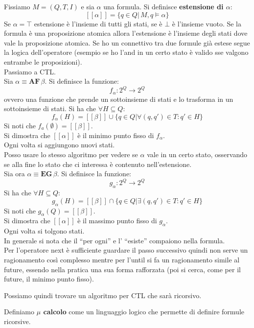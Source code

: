 \begin{definizione}
  Fissiamo $M=(Q, T, I)$ e sia $\alpha$ una formula. Si definisce
  \textbf{estensione di $\alpha$}:
  \[[[\alpha]]=\{q\in Q|\, M, q\vDash \alpha\}\]
  Se $\alpha=\top$ estensione è l'insieme di tutti gli stati, se è $\bot$ è
  l'insieme vuoto. Se la formula è una proposizione atomica allora l'estensione
  è l'insieme degli stati dove vale la proposizione atomica. Se ho un connettivo
  tra due formule già estese segue la logica dell'operatore (esempio se ho l'and
  in un certo stato è valido sse valgono entrambe le proposizioni).\\
  Passiamo a CTL.\\
  Sia $\alpha\equiv\mathbf{AF}\,\beta$. Si
  definisce la funzione:
  \[f_\alpha:2^Q\to 2^Q\]
  ovvero una funzione che prende un sottoinsieme di stati e lo trasforma in un
  sottoinsieme di stati. Si ha che $\forall H\subseteq Q$:
  \[f_\alpha(H)=[[\beta]]\cup\{q\in Q|\forall(q, q')\in T:q'\in H\}\]
  Si noti che $f_a(\emptyset)=[[\beta]]$.\\
  Si dimostra che $[[\alpha]]$ è il minimo punto fisso di $f_\alpha$.\\
  Ogni volta si aggiungono nuovi stati.\\
  Posso usare lo stesso algoritmo per vedere se $\alpha$ vale in un certo stato,
  osservando se alla fine lo stato che ci interessa è contenuto
  nell'estensione.\\
  Sia ora $\alpha\equiv \mathbf{EG}\,\beta$. Si
  definisce la funzione:
  \[g_\alpha:2^Q\to 2^Q\]
  Si ha che $\forall H\subseteq Q$:
  \[g_\alpha(H)=[[\beta]]\cap\{q\in Q|\exists(q, q')\in T:q'\in H\}\]
  Si noti che $g_\alpha(Q)=[[\beta]]$.\\
  Si dimostra che $[[\alpha]]$ è il massimo punto fisso di $g_\alpha$.\\
  Ogni volta si tolgono stati.\\
  In generale si nota che il ``per ogni'' e l' ``esiste'' compaiono nella
  formula.\\
  Per l'operatore next è sufficiente guardare il passo successivo quindi non
  serve un ragionamento così complesso mentre per l'until si fa un ragionamento
  simile al future, essendo nella pratica una sua forma rafforzata (poi si
  cerca, come per il future, il minimo punto fisso).
\end{definizione}
Possiamo quindi trovare un algoritmo per CTL che sarà ricorsivo.
\begin{definizione}
  Definiamo \textbf{$\mu$ calcolo} come un linguaggio logico che permette di
  definire formule ricorsive.  
\end{definizione}
